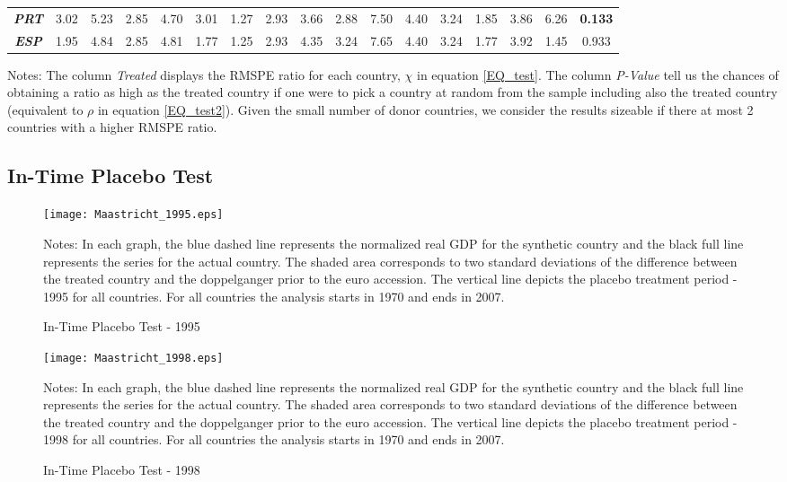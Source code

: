 \documentclass[12pt]{article}
\newcommand{\annote}[1]{\parbox{\textwidth}{\renewcommand{\baselinestretch}{1.0}\vspace{12pt} \small Notes: #1}}
\begin{document}
\begin{appendices}
\begin{landscape}
\begin{table}[htbp]
\begin{tabular}{cccccccccccccccc|c}
\textit{\textbf{PRT}} & 3.02 & 5.23 & 2.85 & 4.70 & 3.01 & 1.27 & 2.93 & 3.66 & 2.88 & 7.50 & 4.40 & 3.24 & 1.85 & 3.86 & 6.26  & \textbf{0.133} \\
\textit{\textbf{ESP}} & 1.95 & 4.84 & 2.85 & 4.81 & 1.77 & 1.25 & 2.93 & 4.35 & 3.24 & 7.65 & 4.40 & 3.24 & 1.77 & 3.92 & 1.45  & 0.933 \\
\bottomrule
\end{tabular} 
\annote{The column \textit{Treated} displays the RMSPE ratio for each country, $\chi$ in equation \ref{EQ_test}. The column \textit{P-Value} tell us the chances of obtaining a ratio as high as the treated country if one were to pick a country at random from the sample including also the treated country (equivalent to $\rho$ in equation \ref{EQ_test2}). Given the small number of donor countries, we consider the results sizeable if there at most 2 countries with a higher RMSPE ratio.}
\end{table}

\end{landscape}

\clearpage

\subsection{In-Time Placebo Test}
\begin{figure}[h!]
    \centering
    \caption{In-Time Placebo Test - 1995 \label{F_1995}}
    \texttt{[image: Maastricht\_1995.eps]}
    \annote{In each graph, the blue dashed line represents the normalized real GDP for the synthetic country and the black full line represents the series for the actual country. The shaded area corresponds to two standard deviations of the difference between the treated country and the doppelganger prior to the euro accession. The vertical line depicts the placebo treatment period - 1995 for all countries. For all countries the analysis starts in 1970 and ends in 2007. 
    }
\end{figure}
\clearpage 
\begin{figure}[h!]
    \centering
    \caption{In-Time Placebo Test - 1998 \label{F_1998}}
    \texttt{[image: Maastricht\_1998.eps]}
    \annote{In each graph, the blue dashed line represents the normalized real GDP for the synthetic country and the black full line represents the series for the actual country. The shaded area corresponds to two standard deviations of the difference between the treated country and the doppelganger prior to the euro accession. The vertical line depicts the placebo treatment period - 1998 for all countries. For all countries the analysis starts in 1970 and ends in 2007.
    }
\end{figure}



\end{appendices}
\end{document}
